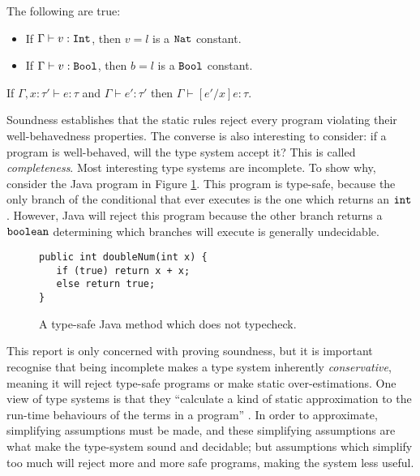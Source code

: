 \begin{lemma}
The following are true:
\begin{itemize}
	\setlength\itemsep{-0.7em}
	\item If $\Gamma \vdash v: \mathtt{Int}$, then $v = l$ is a $\mathtt{Nat}$ constant.
	\item If $\Gamma \vdash v: \mathtt{Bool}$, then $b = l$ is a $\mathtt{Bool}$ constant.
\end{itemize}
\end{lemma}

\begin{lemma}[Substitution]
If $\Gamma, x: \tau' \vdash e: \tau$ and $\Gamma \vdash e': \tau'$ then $\Gamma \vdash [e'/x]e:  \tau$.
\end{lemma}

Soundness establishes that the static rules reject every program violating their well-behavedness properties. The converse is also interesting to consider: if a program is well-behaved, will the type system accept it? This is called \textit{completeness}. Most interesting type systems are incomplete. To show why, consider the Java program in Figure \ref{ref:java_typing_completeness}. This program is type-safe, because the only branch of the conditional that ever executes is the one which returns an $\mathtt{int}$. However, Java will reject this program because the other branch returns a $\mathtt{boolean}$ determining which branches will execute is generally undecidable.

\begin{figure}[h]
\vspace{-5pt}

\begin{lstlisting}
public int doubleNum(int x) {
   if (true) return x + x;
   else return true;
}
\end{lstlisting}
 
\vspace{-12pt}
\caption{A type-safe Java method which does not typecheck.}
\label{ref:java_typing_completeness}
\end{figure}

This report is only concerned with proving soundness, but it is important recognise that being incomplete makes a type system inherently \textit{conservative}, meaning it will reject type-safe programs or make static over-estimations. One view of type systems is that they ``calculate a kind of static  approximation to the run-time behaviours of the terms in a program'' \cite[p. 2]{tapl}. In order to approximate, simplifying assumptions must be made, and these simplifying assumptions are what make the type-system sound and decidable; but assumptions which simplify too much will reject more and more safe programs, making the system less useful.


